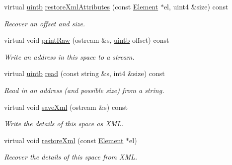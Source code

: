 \begin{DoxyCompactItemize}
virtual \mbox{\hyperlink{types_8h_a2db313c5d32a12b01d26ac9b3bca178f}{uintb}} \mbox{\hyperlink{class_addr_space_aa20e53222697512db0a64db75179ead2}{restore\+Xml\+Attributes}} (const \mbox{\hyperlink{class_element}{Element}} $\ast$el, uint4 \&size) const
\begin{DoxyCompactList}\small\item\em Recover an offset and size. \end{DoxyCompactList}\item 
virtual void \mbox{\hyperlink{class_addr_space_a76819b70cd6b6ae8601ac1821f86b929}{print\+Raw}} (ostream \&s, \mbox{\hyperlink{types_8h_a2db313c5d32a12b01d26ac9b3bca178f}{uintb}} offset) const
\begin{DoxyCompactList}\small\item\em Write an address in this space to a stream. \end{DoxyCompactList}\item 
virtual \mbox{\hyperlink{types_8h_a2db313c5d32a12b01d26ac9b3bca178f}{uintb}} \mbox{\hyperlink{class_addr_space_ad0a4a2744ee7de8f592dfaf817a6c93b}{read}} (const string \&s, int4 \&size) const
\begin{DoxyCompactList}\small\item\em Read in an address (and possible size) from a string. \end{DoxyCompactList}\item 
virtual void \mbox{\hyperlink{class_addr_space_ac073a4d446677c54d769abba01318864}{save\+Xml}} (ostream \&s) const
\begin{DoxyCompactList}\small\item\em Write the details of this space as X\+ML. \end{DoxyCompactList}\item 
virtual void \mbox{\hyperlink{class_addr_space_aa2fe50d288eef7ea713cce99774c4eca}{restore\+Xml}} (const \mbox{\hyperlink{class_element}{Element}} $\ast$el)
\begin{DoxyCompactList}\small\item\em Recover the details of this space from X\+ML. \end{DoxyCompactList}\end{DoxyCompactItemize}
